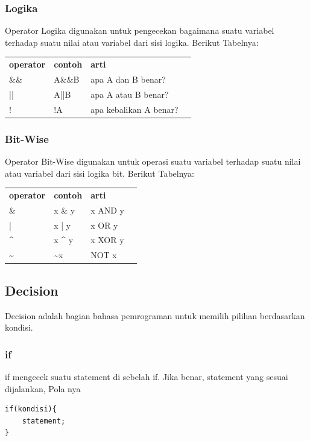 \documentclass[12pt,]{article}
\begin{document}
	\subsubsection{Logika}
	Operator Logika digunakan untuk pengecekan bagaimana suatu variabel terhadap suatu nilai atau variabel dari sisi logika.
	Berikut Tabelnya:
	\begin{table}[H]
		\begin{tabular}{|l|l|l|l}
			\cline{1-3}
			\textbf{operator} & \textbf{contoh} & \textbf{arti} \\ \cline{1-3}
			\&\&              & A\&\&B          & apa A dan B benar? \\ \cline{1-3}
			||                & A||B            & apa A atau B benar? \\ \cline{1-3}
			!                 & !A              & apa kebalikan A benar?  \\ \cline{1-3}
		\end{tabular}
	\end{table}

	\subsubsection{Bit-Wise}
	Operator Bit-Wise digunakan untuk operasi suatu variabel terhadap suatu nilai atau variabel dari sisi logika bit.
	Berikut Tabelnya:
	\begin{table}[H]
		\begin{tabular}{|l|l|l|l}
			\cline{1-3}
			\textbf{operator} & \textbf{contoh} & \textbf{arti} \\ \cline{1-3}
			\&             & x \& y       & x AND y  \\ \cline{1-3}
			|              & x | y        & x OR y	 \\ \cline{1-3}
			\^{}           & x \^{} y     & x XOR y  \\ \cline{1-3}
			\textasciitilde & \textasciitilde x & NOT x  \\ \cline{1-3}
		\end{tabular}
	\end{table}

	\newpage
	\subsection{Decision}

	Decision adalah bagian bahasa pemrograman untuk memilih pilihan berdasarkan kondisi.

	\subsubsection{if}
	if mengecek suatu statement di sebelah if.
	Jika benar, statement yang sesuai dijalankan,
	Pola nya
	\begin{verbatim}
if(kondisi){
	statement;
}
	\end{verbatim}
\end{document}
